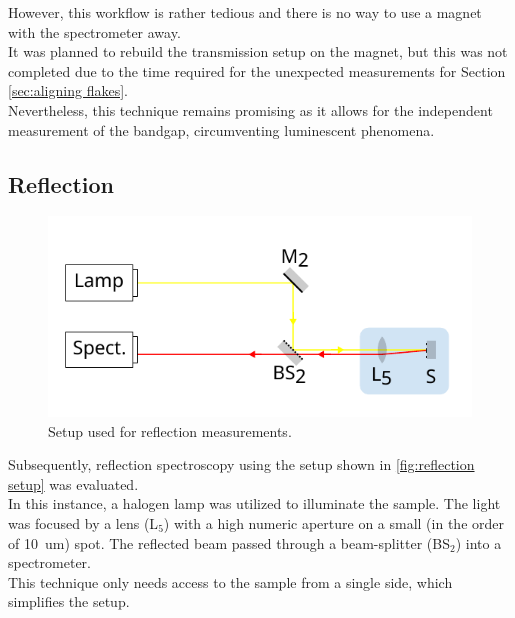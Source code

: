 \documentclass[
	oneside,
	parskip=half,
	a4paper,
]{scrbook}
\begin{document}
However, this workflow is rather tedious and there is no way to use a magnet with the spectrometer away.\\
It was planned to rebuild the transmission setup on the magnet, but this was not completed due to the time required for the unexpected measurements for Section \ref{sec:aligning flakes}.\\
Nevertheless, this technique remains promising as it allows for the independent measurement of the bandgap, circumventing luminescent phenomena.

\clearpage
\subsection{Reflection}
\begin{figure}
	\centering
	\includegraphics{../figures/setup_reflection.pdf}
	\caption{Setup used for reflection measurements.}
	\label{fig:reflection setup}
\end{figure}
Subsequently, reflection spectroscopy using the setup shown in \autoref{fig:reflection setup} was evaluated.\\
In this instance, a halogen lamp was utilized to illuminate the sample.
The light was focused by a lens (L$_5$) with a high numeric aperture on a small (in the order of \SI{10}{um}) spot.
The reflected beam passed through a beam-splitter (BS$_2$) into a spectrometer.\\
This technique only needs access to the sample from a single side, which simplifies the setup.
\end{document}
